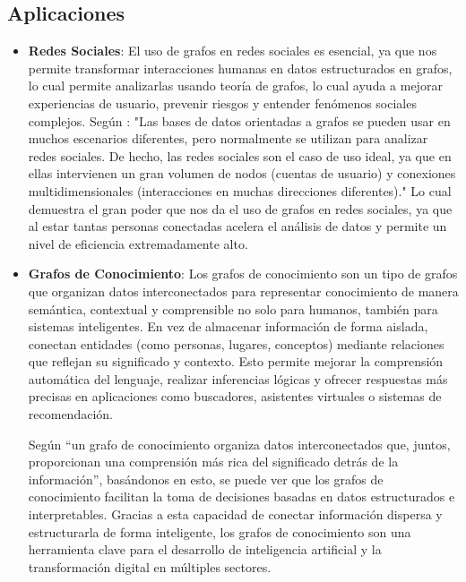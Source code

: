 \documentclass[11pt]{article} %
\begin{document}
\subsection{Aplicaciones}
\begin{itemize}
   
\item \textbf{Redes Sociales}:
    El uso de grafos en redes sociales es esencial, ya que nos permite transformar interacciones humanas en datos estructurados en grafos, lo cual permite analizarlas usando teoría de grafos, lo cual ayuda a mejorar experiencias de usuario, prevenir riesgos y entender fenómenos sociales complejos. 
    Según \cite{oracle2024graph}: "Las bases de datos orientadas a grafos se pueden usar en muchos escenarios diferentes, pero normalmente se utilizan para analizar redes sociales. De hecho, las redes sociales son el caso de uso ideal, ya que en ellas intervienen un gran volumen de nodos (cuentas de usuario) y conexiones multidimensionales (interacciones en muchas direcciones diferentes)." Lo cual demuestra el gran poder que nos da el uso de grafos en redes sociales, ya que al estar tantas personas conectadas acelera el análisis de datos y permite un nivel de eficiencia extremadamente alto.
\item \textbf{Grafos de Conocimiento}:
Los grafos de conocimiento son un tipo de grafos que organizan datos interconectados para representar conocimiento de manera semántica, contextual y comprensible no solo para humanos, también para sistemas inteligentes. En vez de almacenar información de forma aislada, conectan entidades (como personas, lugares, conceptos) mediante relaciones que reflejan su significado y contexto. Esto permite mejorar la comprensión automática del lenguaje, realizar inferencias lógicas y ofrecer respuestas más precisas en aplicaciones como buscadores, asistentes virtuales o sistemas de recomendación. 

Según \cite{ibm_knowledge_graph} “un grafo de conocimiento organiza datos interconectados que, juntos, proporcionan una comprensión más rica del significado detrás de la información”, basándonos en esto, se puede ver que los grafos de conocimiento facilitan la toma de decisiones basadas en datos estructurados e interpretables. Gracias a esta capacidad de conectar información dispersa y estructurarla de forma inteligente, los grafos de conocimiento son una herramienta clave para el desarrollo de inteligencia artificial y la transformación digital en múltiples sectores. 
\end{itemize}
\end{document}
